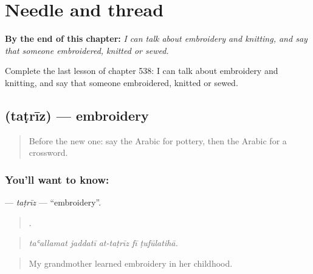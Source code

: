 
\chapter{Needle and thread}
\label{ch:ar-needle-and-thread}

\begin{chapteropening}
\textbf{By the end of this chapter:} \emph{I can talk about embroidery and knitting, and say that someone embroidered, knitted or sewed.}

Complete the last lesson of chapter 538: I can talk about embroidery and knitting, and say that someone embroidered, knitted or sewed.
\end{chapteropening}

\section[\texorpdfstring{\ar{تطريز} (taṭrīz)}{تطريز (taṭrīz)}]{ (taṭrīz) — embroidery}

\label{lesson:AR-C538-tatriz}



\begin{quote}
Before the new one: say the Arabic for pottery, then the Arabic for a crossword.
\end{quote}

\subsection*{You'll want to know: }
\textbf{} — \emph{taṭrīz} — \textquotedblleft{}embroidery\textquotedblright{}.

\begin{quote}
    .
\end{quote}

\begin{quote}
\emph{taʿallamat jaddatī at-taṭrīz fī ṭufūlatihā.}
\end{quote}

\begin{quote}
My grandmother learned embroidery in her childhood.
\end{quote}

